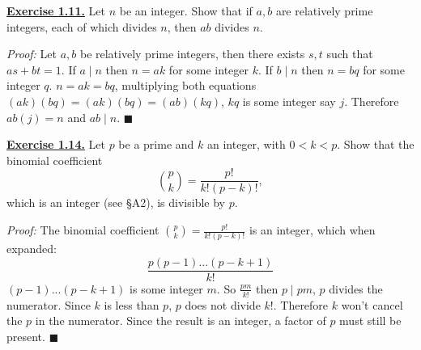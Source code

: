 \documentclass{article}
\begin{document}
\noindent
\underline{\textbf{Exercise 1.11.}} Let \( n \) be an integer. Show that if \( a, b \) are relatively prime integers, each of which divides \( n \), then \( ab \) divides \( n \).

\begin{greenbox}
    \textit{Proof:} Let $a,b$ be relatively prime integers, then there exists $s,t$ such that $as + bt = 1$.
    If $a\mid n$ then $n = ak$ for some integer $k$. If $b\mid n$ then $n = bq$ for some integer $q$.
    $ n = ak = bq$, multiplying both equations $(ak)(bq) = (ak)(bq) = (ab)(kq)$, $kq$ is some integer say $j$.
    Therefore $ab(j) = n$ and $ab\mid n$. \hfill \(\blacksquare\)
\end{greenbox}

\newpage
\noindent
\underline{\textbf{Exercise 1.14.}} Let \( p \) be a prime and \( k \) an integer, with \( 0 < k < p \). Show that the binomial coefficient
\[
    \binom{p}{k} = \frac{p!}{k!(p - k)!},
\]
which is an integer (see §A2), is divisible by \( p \).

\begin{greenbox}
    \textit{Proof:} The binomial coefficient \(\binom{p}{k} = \frac{p!}{k!(p - k)!}\) is an integer, which when expanded:\\
    \[
        \frac{p(p-1)...(p-k+1)}{k!}
    \]
    $(p-1)...(p-k+1)$ is some integer $m$. So $\frac{pm}{k!}$ then $p\mid pm$, $p$ divides the numerator.
    Since $k$ is less than $p$, $p$ does not divide $k!$. Therefore $k$ won't cancel the $p$ in the numerator.
    Since the result is an integer, a factor of $p$ must still be present. \hfill \(\blacksquare\)


\end{greenbox}
\end{document}
